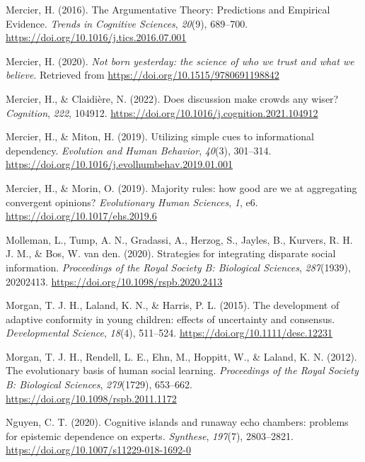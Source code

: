 \documentclass[
  doc,floatsintext]{apa6}
\newlength{\cslhangindent}
\newenvironment{CSLReferences}[2] %
 {\begin{list}{}{%
  \setlength{\itemindent}{0pt}
  \setlength{\leftmargin}{0pt}
  \setlength{\parsep}{0pt}
  \ifodd #1
   \setlength{\leftmargin}{\cslhangindent}
   \setlength{\itemindent}{-1\cslhangindent}
  \fi
  \setlength{\itemsep}{#2\baselineskip}}}
 {\end{list}}
\begin{document}
\begin{CSLReferences}{1}{0}
Mercier, H. (2016). The Argumentative Theory: Predictions and Empirical Evidence. \emph{Trends in Cognitive Sciences}, \emph{20}(9), 689--700. \url{https://doi.org/10.1016/j.tics.2016.07.001}

Mercier, H. (2020). \emph{Not born yesterday: the science of who we trust and what we believe}. Retrieved from \url{https://doi.org/10.1515/9780691198842}

Mercier, H., \& Claidière, N. (2022). Does discussion make crowds any wiser? \emph{Cognition}, \emph{222}, 104912. \url{https://doi.org/10.1016/j.cognition.2021.104912}

Mercier, H., \& Miton, H. (2019). Utilizing simple cues to informational dependency. \emph{Evolution and Human Behavior}, \emph{40}(3), 301--314. \url{https://doi.org/10.1016/j.evolhumbehav.2019.01.001}

Mercier, H., \& Morin, O. (2019). Majority rules: how good are we at aggregating convergent opinions? \emph{Evolutionary Human Sciences}, \emph{1}, e6. \url{https://doi.org/10.1017/ehs.2019.6}

Molleman, L., Tump, A. N., Gradassi, A., Herzog, S., Jayles, B., Kurvers, R. H. J. M., \& Bos, W. van den. (2020). Strategies for integrating disparate social information. \emph{Proceedings of the Royal Society B: Biological Sciences}, \emph{287}(1939), 20202413. \url{https://doi.org/10.1098/rspb.2020.2413}

Morgan, T. J. H., Laland, K. N., \& Harris, P. L. (2015). The development of adaptive conformity in young children: effects of uncertainty and consensus. \emph{Developmental Science}, \emph{18}(4), 511--524. \url{https://doi.org/10.1111/desc.12231}

Morgan, T. J. H., Rendell, L. E., Ehn, M., Hoppitt, W., \& Laland, K. N. (2012). The evolutionary basis of human social learning. \emph{Proceedings of the Royal Society B: Biological Sciences}, \emph{279}(1729), 653--662. \url{https://doi.org/10.1098/rspb.2011.1172}

Nguyen, C. T. (2020). Cognitive islands and runaway echo chambers: problems for epistemic dependence on experts. \emph{Synthese}, \emph{197}(7), 2803--2821. \url{https://doi.org/10.1007/s11229-018-1692-0}


\end{CSLReferences}
\end{document}
